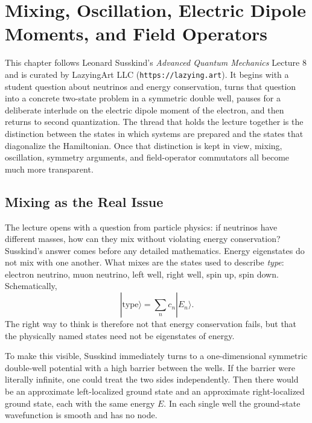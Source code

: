 \chapter{Mixing, Oscillation, Electric Dipole Moments, and Field Operators}

This chapter follows Leonard Susskind's \emph{Advanced Quantum Mechanics} Lecture 8 and is curated by LazyingArt LLC (\texttt{https://lazying.art}). It begins with a student question about neutrinos and energy conservation, turns that question into a concrete two-state problem in a symmetric double well, pauses for a deliberate interlude on the electric dipole moment of the electron, and then returns to second quantization. The thread that holds the lecture together is the distinction between the states in which systems are prepared and the states that diagonalize the Hamiltonian. Once that distinction is kept in view, mixing, oscillation, symmetry arguments, and field-operator commutators all become much more transparent.

\section{Mixing as the Real Issue}

The lecture opens with a question from particle physics: if neutrinos have different masses, how can they mix without violating energy conservation? Susskind's answer comes before any detailed mathematics. Energy eigenstates do not mix with one another. What mixes are the states used to describe \emph{type}: electron neutrino, muon neutrino, left well, right well, spin up, spin down. Schematically,
\begin{equation}
|\text{type}\rangle = \sum_n c_n |E_n\rangle.
\end{equation}
The right way to think is therefore not that energy conservation fails, but that the physically named states need not be eigenstates of energy.

To make this visible, Susskind immediately turns to a one-dimensional symmetric double-well potential with a high barrier between the wells. If the barrier were literally infinite, one could treat the two sides independently. Then there would be an approximate left-localized ground state and an approximate right-localized ground state, each with the same energy \(E\). In each single well the ground-state wavefunction is smooth and has no node.

